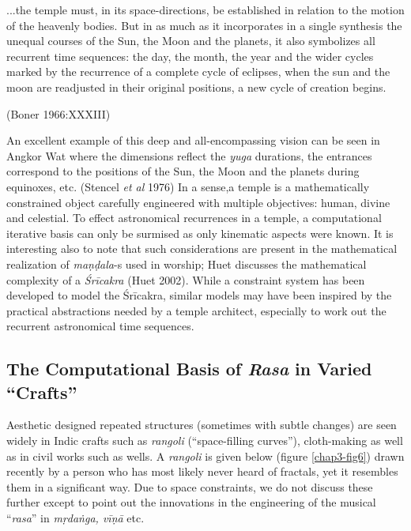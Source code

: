 \begin{myquote}
...the temple must, in its space-directions, be established in relation to the motion of the heavenly bodies. But in as much as it incorporates in a single synthesis the unequal courses of the Sun, the Moon and the planets, it also symbolizes all recurrent time sequences: the day, the month, the year and the wider cycles marked by the recurrence of a complete cycle of eclipses, when the sun and the moon are readjusted in their original positions, a new cycle of creation begins. 

\hfill(Boner 1966:XXXIII)
\end{myquote}

An excellent example of this deep and all-encompassing vision can be seen in Angkor Wat where the dimensions reflect the \textsl{yuga} durations, the entrances correspond to the positions of the Sun, the Moon and the planets during equinoxes, etc. (Stencel \textsl{et al} 1976) In a sense,\break a temple is a mathematically constrained object carefully engineered with multiple objectives: human, divine and celestial. To effect astronomical recurrences in a temple, a computational iterative basis can only be surmised as only kinematic aspects were known. It is interesting also to note that such considerations are present in the mathematical realization of \textsl{maṇḍala}-s used in worship; Huet discusses the mathematical complexity of a \textsl{Śrīcakra} (Huet 2002). While a constraint system has been developed to model the Śrīcakra, similar models may have been inspired by the practical abstractions needed by a temple architect, especially to work out the recurrent astronomical time sequences.\\[-20pt]

\subsection{The Computational Basis of \textsl{Rasa} in Varied\\ “Crafts”}\label{chap3-sec5.4}

Aesthetic designed repeated structures (sometimes with subtle changes) are seen widely in Indic crafts such as \textsl{rangoli} (“space-filling curves”), cloth-making as well as in civil works such as wells. A \textsl{rangoli} is given below (figure \ref{chap3-fig6}) drawn recently by a person who has most likely never heard of fractals, yet it resembles them in a significant way. Due to space constraints, we do not discuss these further except to point out the innovations in the engineering of the musical “\textsl{rasa}” in \textsl{mṛdaṅga, vīṇā} etc.

